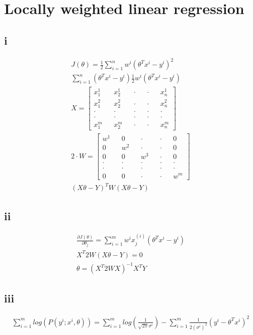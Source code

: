 \documentclass[11pt]{article}
\begin{document}
\section{Locally weighted linear regression}
\subsection{i}
\begin{gather}
    J(\theta) = \frac{1}{2}\sum_{i = 1}^{n} w^{i}(\theta^{T}x^{i}-y^{i})^2\\
    \sum_{i = 1}^{n} (\theta^{T}x^{i}-y^{i})\frac{1}{2}w^{i}(\theta^{T}x^{i}-y^{i})\\
    X = 
    \begin{bmatrix}
        x_{1}^{1} && x_{2}^{1} && \cdot && \cdot &&  x_{n}^{1}\\
        x_{1}^{2} && x_{2}^{2} && \cdot && \cdot &&  x_{n}^{2} \\
        \cdot     && \cdot     && \cdot && \cdot &&  \cdot      \\
        \cdot     && \cdot     && \cdot && \cdot &&  \cdot      \\
        x_{1}^{m} && x_{2}^{m} && \cdot && \cdot &&  x_{n}^{m}
    \end{bmatrix}
    \\
    2\cdot W = 
    \begin{bmatrix}
        w^{1} && 0 && \cdot && \cdot &&  0\\
        0 && w^{2} && \cdot && \cdot &&  0 \\
        0 && 0 && w^{3} && \cdot &&  0 \\
        \cdot     && \cdot     && \cdot && \cdot &&  \cdot\\
        \cdot     && \cdot     && \cdot && \cdot &&  \cdot\\
        0 && 0 && \cdot && \cdot &&  w^{m}
    \end{bmatrix}
    \\
    (X\theta-Y)^T W (X\theta-Y)
\end{gather}
\subsection{ii}
\begin{gather}
    \frac{\partial J(\theta)}{\partial \theta_j} = 
    \sum_{i=1}^{m} w^{i}x^(i)_{j}(\theta^Tx^{i}-y^{i})
    \\
    X^T2W(X\theta-Y) = 0\\
    \theta = (X^T2WX)^{-1}X^TY
\end{gather}
\subsection{iii}
\begin{gather}
\sum_{i = 1}^{m} log(P(y^{i};x^{i},\theta)) = \sum_{i = 1}^{m}
log(\frac{1}{\sqrt{2\pi}\sigma^{i}})-\sum_{i = 1}^{m}\frac{1}{2(\sigma^{i})^2}
(y^{i}-\theta^Tx^{i})^2
\end{gather}
\end{document}
